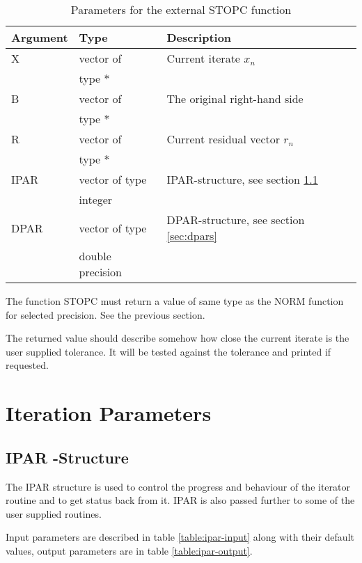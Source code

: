 \documentclass[11pt,a4paper,english,oneside]{report}
\begin{document}
\begin{table}[H]
\begin{tabular*}{\textwidth}{lll}
\hline\hline
{\bfseries Argument} & {\bfseries Type} & {\bfseries Description} \\
\hline
X	& vector of 		& Current iterate $x_{n}$ \\
	& type $*$		& \\
B	& vector of 		& The original right-hand side \\
	& type $*$		& \\
R	& vector of 		& Current residual vector $r_{n}$ \\
	& type $*$		& \\
IPAR	& vector of type	& IPAR-structure, see section \ref{sec:ipars} \\
	& integer		& \\
DPAR	& vector of type	& DPAR-structure, see section \ref{sec:dpars} \\
	& double precision	& \\
\hline\hline
\end{tabular*}
\caption{Parameters for the external STOPC function}
\label{table:stopc-param}
\end{table}

The function {\ttfamily STOPC} must return a value of same type as
the {\ttfamily NORM} function for selected precision. See the previous
section.

The returned value should describe somehow how close the current iterate is
the user supplied tolerance. It will be tested against the tolerance and
printed if requested.


\section{Iteration Parameters}

\subsection{IPAR -Structure}
\label{sec:ipars}

The {\ttfamily IPAR} structure is used to control the progress and behaviour
of the iterator routine and to get status back from it. {\ttfamily IPAR}
is also passed further to some of the user supplied routines.

Input parameters are described in table \ref{table:ipar-input} along with
their default values, output parameters are in table \ref{table:ipar-output}.
\end{document}
